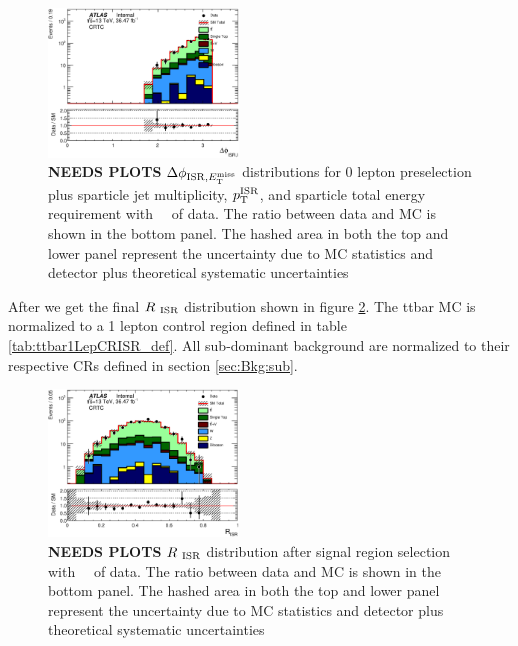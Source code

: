 \begin{figure}[htbp]
  \begin{center}
     \includegraphics[width=0.45\textwidth]{figures/ttbar/postfit/CA_dphiISRI_CRTopC_log}
  \end{center}
  \caption{{\bf NEEDS PLOTS} $\Delta\phi_{\mathrm{ISR},E_{\mathrm{T}}^{\mathrm{miss}}}$ distributions for 0 lepton preselection plus sparticle jet multiplicity, $p_{\mathrm{T}}^{\mathrm{ISR}}$, and sparticle total energy requirement with \intlumi\ \ifb\ of data. The ratio between data and MC is shown in the bottom panel. The hashed area in both the top and lower panel represent the uncertainty due to MC statistics and detector plus theoretical systematic uncertainties}
  \label{fig:SR:dphiISRMET}
\end{figure}

\indent After we get the final $R_{~\mathrm{ISR}}$ distribution shown in figure \ref{fig:SR:RISR}. The ttbar MC is normalized to a 1 lepton control region defined in table \ref{tab:ttbar1LepCRISR_def}.  All sub-dominant background are normalized to their respective CRs defined in section \ref{sec:Bkg:sub}.\\

\begin{figure}[htbp]
  \begin{center}
     \includegraphics[width=0.45\textwidth]{figures/ttbar/postfit/CA_RISR_CRTopC_log}
  \end{center}
  \caption{{\bf NEEDS PLOTS} $R_{~\mathrm{ISR}}$ distribution after signal region selection with \intlumi\ \ifb\ of data. The ratio between data and MC is shown in the bottom panel. The hashed area in both the top and lower panel represent the uncertainty due to MC statistics and detector plus theoretical systematic uncertainties}
  \label{fig:SR:RISR}
\end{figure}

